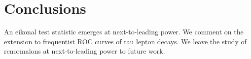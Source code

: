 \section{Conclusions}\label{sec:conclusions}

An eikonal test statistic emerges at next-to-leading power. We comment
on the extension to frequentist ROC curves of tau lepton decays. We
leave the study of renormalons at next-to-leading power to future work.

